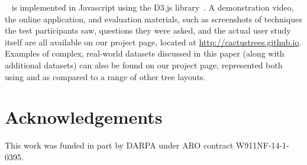 \documentclass[a4paper]{llncs}
\begin{document}
\theName{}~\cite{Dang2017CactusTrees} is implemented in Javascript using the D3.js library~\cite{bostock2011d3}. A demonstration video, the online \theName{} application, and evaluation materials, such as screenshots of techniques the test participants saw, questions they were asked, and the actual user study itself are all available on our project page, located at \url{http://cactustrees.github.io}. 
Examples of complex, real-world datasets discussed in this paper (along with additional datasets) can also be found on our project page, represented both using \theName{} and as compared to a range of other tree layouts.

\section*{Acknowledgements}
This work was funded in part by DARPA under ARO contract W911NF-14-1-0395. 



\end{document}
